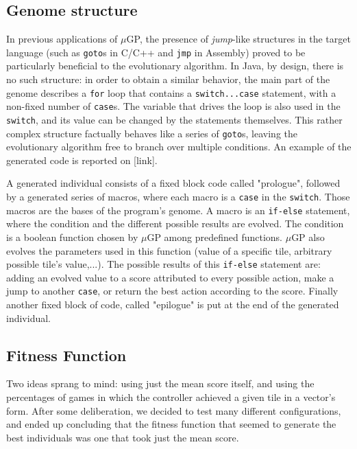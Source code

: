 \documentclass[11pt,twocolumn]{article}
\begin{document}
\subsection{Genome structure}

In previous applications of $\mu$GP, the presence of \emph{jump}-like structures in the target language (such as \texttt{goto}s in C/C++ and \texttt{jmp} in Assembly) proved to be particularly beneficial to the evolutionary algorithm. In Java, by design, there is no such structure: in order to obtain a similar behavior, the main part of the genome describes a \texttt{for} loop that contains a \texttt{switch...case} statement, with a non-fixed number of \texttt{case}s. The variable that drives the loop is also used in the \texttt{switch}, and its value can be changed by the statements themselves. This rather complex structure factually behaves like a series of \texttt{goto}s, leaving the evolutionary algorithm free to branch over multiple conditions. An example of the generated code is reported on [link].



A generated individual consists of a fixed block code  called "prologue", followed by a generated series of macros, where each macro is a \texttt{case} in the \texttt{switch}. Those macros are the bases of the program's genome. A macro is an \texttt{if-else} statement, where the condition and the different possible results are evolved. The condition is a boolean function chosen by $\mu$GP among predefined functions. $\mu$GP also evolves the parameters used in this function (value of a specific tile, arbitrary possible tile's value,...). The possible results of this \texttt{if-else} statement are: adding an evolved value to a score attributed to every possible action, make a jump to another \texttt{case}, or return the best action according to the score.
Finally another fixed block of code, called "epilogue" is put at the end of the generated individual.



\subsection{Fitness Function}
Two ideas sprang to mind: using just the mean score itself, and using the percentages of games in which the controller achieved a given tile in a vector's form. After some deliberation, we decided to test many different configurations, and ended up concluding that the fitness function that seemed to generate the best individuals was one that took just the mean score.
\end{document}
